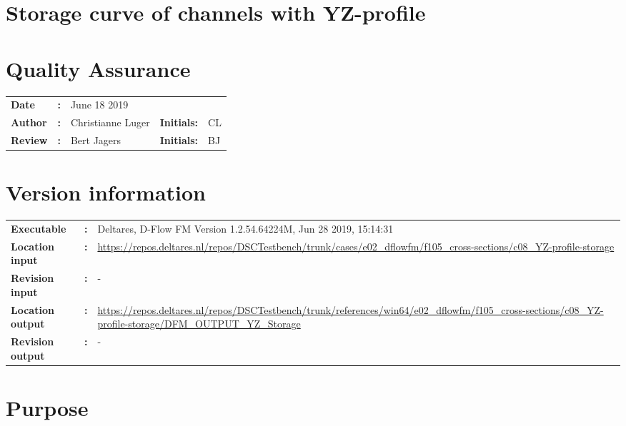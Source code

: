 

\section{Storage curve of channels with YZ-profile}
\newrefsegment

\section*{Quality Assurance}
\begin{tabular}{@{}p{27mm}@{}p{0mm}p{\textwidth-52mm-48pt}p{15mm}p{10mm}}
\textbf{Date} & \textbf{:} &   June 18 2019\\ 
\textbf{Author} & \textbf{:} & Christianne Luger  & \textbf{Initials:} & CL \\
\textbf{Review} & \textbf{:} & Bert Jagers  & \textbf{Initials:} & BJ 
\end{tabular}

\section*{Version information}
{{
\begin{tabular}{@{}p{27mm}@{}p{0mm}p{\textwidth-27mm-24pt}}
\textbf{Executable}   & \textbf{:} & Deltares, D-Flow FM Version 1.2.54.64224M, Jun 28 2019, 15:14:31  \\
\textbf{Location input}     & \textbf{:} & \url{https://repos.deltares.nl/repos/DSCTestbench/trunk/cases/e02_dflowfm/f105_cross-sections/c08_YZ-profile-storage} \\
\textbf{Revision input} & \textbf{:} & - \\
\textbf{Location output}     & \textbf{:} & \url{https://repos.deltares.nl/repos/DSCTestbench/trunk/references/win64/e02_dflowfm/f105_cross-sections/c08_YZ-profile-storage/DFM_OUTPUT_YZ_Storage} \\
\textbf{Revision output} & \textbf{:} & -
\end{tabular}
}}

\section*{Purpose}

